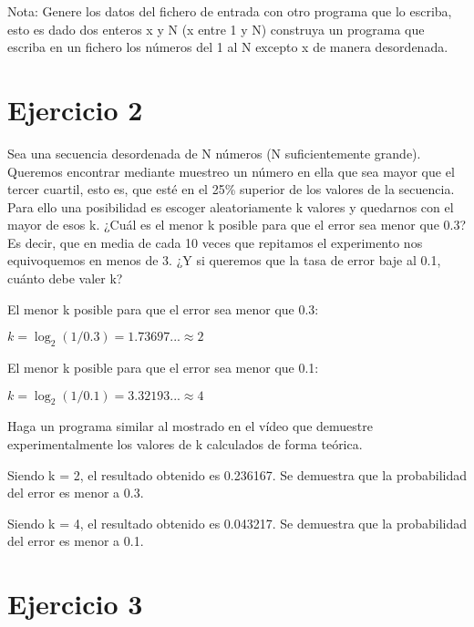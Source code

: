 \documentclass{uimppracticas}
\begin{document}
Nota: Genere los datos del fichero de entrada con otro programa que lo escriba, esto es dado dos enteros x y N (x entre 1 y N) construya un programa que escriba en un fichero los números del 1 al N excepto x de manera desordenada.



\section{Ejercicio 2}

Sea una secuencia desordenada de N números (N suficientemente grande). Queremos encontrar mediante muestreo un número en ella que sea mayor que el tercer cuartil, esto es, que esté en el 25\% superior de los valores de la secuencia. Para ello una posibilidad es escoger aleatoriamente k valores y quedarnos con el mayor de esos k. ¿Cuál es el menor k posible para que el error sea menor que 0.3? Es decir, que en media de cada 10 veces que repitamos el experimento nos equivoquemos en menos de 3. ¿Y si queremos que la tasa de error baje al 0.1, cuánto debe valer k?

El menor k posible para que el error sea menor que 0.3:

\begin{center}
	$ k = \log_2(1/0.3) = 1.73697... \approx 2 $
\end{center}

El menor k posible para que el error sea menor que 0.1:

\begin{center}
	$ k = \log_2(1/0.1) = 3.32193... \approx 4 $
\end{center}

Haga un programa similar al mostrado en el vídeo que demuestre experimentalmente los valores de k calculados de forma teórica.



Siendo k = 2, el resultado obtenido es 0.236167. Se demuestra que la probabilidad del error es menor a 0.3.

Siendo k = 4, el resultado obtenido es 0.043217. Se demuestra que la probabilidad del error es menor a 0.1.

\section{Ejercicio 3}
\end{document}
